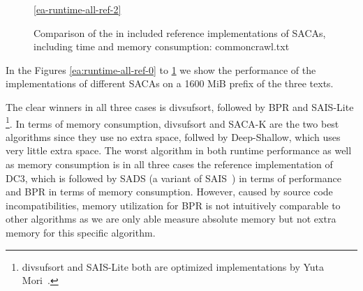 \begin{figure}[!h]
    \medskip
    \ref{ea-runtime-all-ref-2}
    \caption{Comparison of the in \sacabench included reference implementations of SACAs, including time and memory consumption: commoncrawl.txt}
    \label{ea:runtime-all-ref-2}
\end{figure}
\FloatBarrier

In the Figures \ref{ea:runtime-all-ref-0} to \ref{ea:runtime-all-ref-2} we show the performance of
the implementations of different SACAs on a 1600 MiB prefix of the three texts.

The clear winners in all three cases is divsufsort, followed by BPR and SAIS-Lite
\footnote{divsufsort and SAIS-Lite both are optimized implementations by Yuta Mori~\cite{saca:5}.}.
In terms of memory consumption, divsufsort and SACA-K are the two best algorithms since they use no extra space,
follwed by Deep-Shallow, which uses very little extra space.
The worst algorithm in both runtime performance as well as memory consumption is in all three cases the reference implementation of DC3,
which is followed by SADS (a variant of SAIS~\cite{saca:6}) in terms of performance and BPR in terms of memory consumption.
However, caused by source code incompatibilities, memory utilization for BPR is not intuitively comparable to other algorithms as we are only able measure absolute memory but not extra memory for this specific algorithm.


